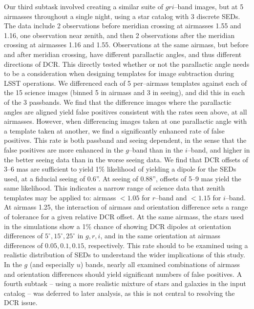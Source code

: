 \documentclass[DM,toc]{lsstdoc}
\begin{document}
Our third subtask involved creating a similar suite of $gri$--band
images, but at 5 airmasses throughout a single night, using a star
catalog with 3 discrete SEDs.  The data include 2 observations before
meridian crossing at airmasses 1.55 and 1.16, one observation near
zenith, and then 2 observations after the meridian crossing at
airmasses 1.16 and 1.55.  Observations at the same airmass, but before
and after meridian crossing, have different parallactic angles, and
thus different directions of DCR.  This directly tested whether or not
the parallactic angle needs to be a consideration when designing
templates for image subtraction during LSST operations.  We
differenced each of 5 per--airmass templates against each of the 15
science images (binned 5 in airmass and 3 in seeing), and did this in
each of the 3 passbands.  We find that the difference images where the
parallactic angles are aligned yield false positives consistent with
the rates seen above, at all airmasses.  However, when differencing
images taken at one parallactic angle with a template taken at
another, we find a significantly enhanced rate of false positives.
This rate is both passband and seeing dependent, in the sense that the
false positives are more enhanced in the $g$--band than in the
$i$--band, and higher in the better seeing data than in the worse
seeing data.  We find that DCR offsets of 3--6 mas are sufficient to
yield 1\% likelihood of yielding a dipole for the SEDs used, at a
fiducial seeing of 0.6''.  At seeing of 0.88'', offsets of 5--9 mas
yield the same likelihood.  This indicates a narrow range of science
data that zenith templates may be applied to: airmass $<1.05$ for
$r$--band and $<1.15$ for $i$--band.  At airmass 1.25, the interaction
of airmass and orientation difference sets a range of tolerance for a
given relative DCR offset.  At the same airmass, the stars used in the
simulations show a 1\% chance of showing DCR dipoles at orientation
differences of $5^{\circ}, 15^{\circ}, 25^{\circ}$ in $g,r,i$, and in
the same orientation at airmass differences of $0.05, 0.1, 0.15$,
respectively.  This rate should to be examined using a realistic
distribution of SEDs to understand the wider implications of this
study.  In the $g$ (and especially $u$) bands, nearly all examined
combinations of airmass and orientation differences should yield
significant numbers of false positives.  A fourth subtask -- using a
more realistic mixture of stars and galaxies in the input catalog --
was deferred to later analysis, as this is not central to resolving
the DCR issue.
\end{document}
